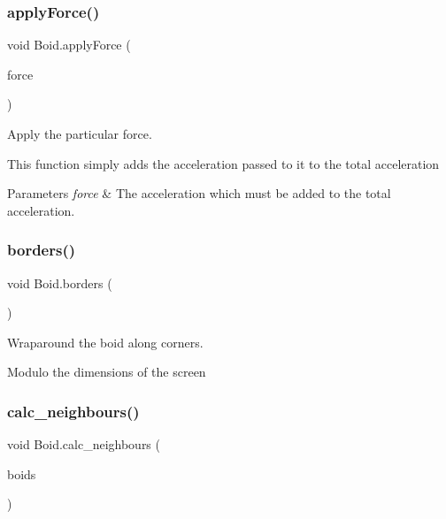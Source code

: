 \subsubsection{\texorpdfstring{apply\+Force()}{applyForce()}}
{\footnotesize\ttfamily void Boid.\+apply\+Force (\begin{DoxyParamCaption}\item[{P\+Vector}]{force }\end{DoxyParamCaption})\hspace{0.3cm}{\ttfamily [inline]}}



Apply the particular force. 

This function simply adds the acceleration passed to it to the total acceleration 
\begin{DoxyParams}{Parameters}
{\em force} & The acceleration which must be added to the total acceleration. \\
\hline
\end{DoxyParams}
\mbox{\label{class_boid_a972b44c740e6c93920e66be20ffeed81}} 
\subsubsection{\texorpdfstring{borders()}{borders()}}
{\footnotesize\ttfamily void Boid.\+borders (\begin{DoxyParamCaption}{ }\end{DoxyParamCaption})\hspace{0.3cm}{\ttfamily [inline]}}



Wraparound the boid along corners. 

Modulo the dimensions of the screen \mbox{\label{class_boid_a3512b360e60eec95f22e1bbaf14d3346}} 
\subsubsection{\texorpdfstring{calc\+\_\+neighbours()}{calc\_neighbours()}}
{\footnotesize\ttfamily void Boid.\+calc\+\_\+neighbours (\begin{DoxyParamCaption}\item[{Array\+List$<$ \mbox{\hyperlink{class_boid}{Boid}} $>$}]{boids }\end{DoxyParamCaption})\hspace{0.3cm}{\ttfamily [inline]}}



